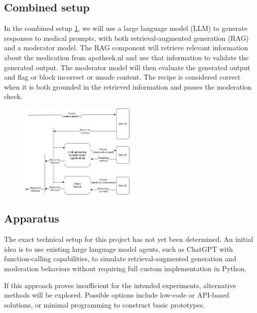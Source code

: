 \subsection{Combined setup}

In the combined setup \ref{fig:combinedSetup}, we will use a large language model (LLM) to generate responses to medical prompts, with both retrieval-augmented generation (RAG) and a moderator model.
The RAG component will retrieve relevant information about the medication from apotheek.nl and use that information to validate the generated output.
The moderator model will then evaluate the generated output and flag or block incorrect or unsafe content.
The recipe is considered correct when it is both grounded in the retrieved information and passes the moderation check.

\begin{figure}[H]
    \includegraphics[width=0.5\textwidth]{figures/combinedSetup.png}
    \label{fig:combinedSetup}
\end{figure}

\subsection{Apparatus}

The exact technical setup for this project has not yet been determined. An initial idea is to use existing large language model agents, such as ChatGPT with function-calling capabilities, to simulate retrieval-augmented generation and moderation behaviors without requiring full custom implementation in Python.

If this approach proves insufficient for the intended experiments, alternative methods will be explored. Possible options include low-code or API-based solutions, or minimal programming to construct basic prototypes.

